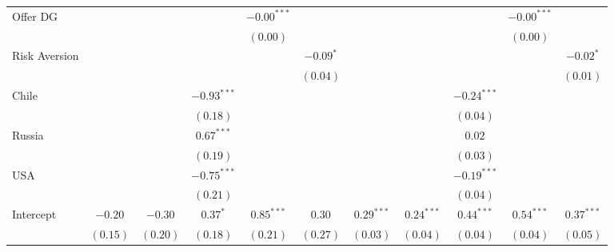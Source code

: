 \begin{table}
\begin{center}
\begin{tabular}{l c c c c c c c c c c }
Offer DG           &               &              &               & $-0.00^{***}$ &              &               &              &               & $-0.00^{***}$ &              \\
                   &               &              &               & $(0.00)$      &              &               &              &               & $(0.00)$      &              \\
Risk Aversion      &               &              &               &               & $-0.09^{*}$  &               &              &               &               & $-0.02^{*}$  \\
                   &               &              &               &               & $(0.04)$     &               &              &               &               & $(0.01)$     \\
Chile              &               &              & $-0.93^{***}$ &               &              &               &              & $-0.24^{***}$ &               &              \\
                   &               &              & $(0.18)$      &               &              &               &              & $(0.04)$      &               &              \\
Russia             &               &              & $0.67^{***}$  &               &              &               &              & $0.02$        &               &              \\
                   &               &              & $(0.19)$      &               &              &               &              & $(0.03)$      &               &              \\
USA                &               &              & $-0.75^{***}$ &               &              &               &              & $-0.19^{***}$ &               &              \\
                   &               &              & $(0.21)$      &               &              &               &              & $(0.04)$      &               &              \\
Intercept          & $-0.20$       & $-0.30$      & $0.37^{*}$    & $0.85^{***}$  & $0.30$       & $0.29^{***}$  & $0.24^{***}$ & $0.44^{***}$  & $0.54^{***}$  & $0.37^{***}$ \\
                   & $(0.15)$      & $(0.20)$     & $(0.18)$      & $(0.21)$      & $(0.27)$     & $(0.03)$      & $(0.04)$     & $(0.04)$      & $(0.04)$      & $(0.05)$     \\

\end{tabular}
\end{center}
\end{table}
